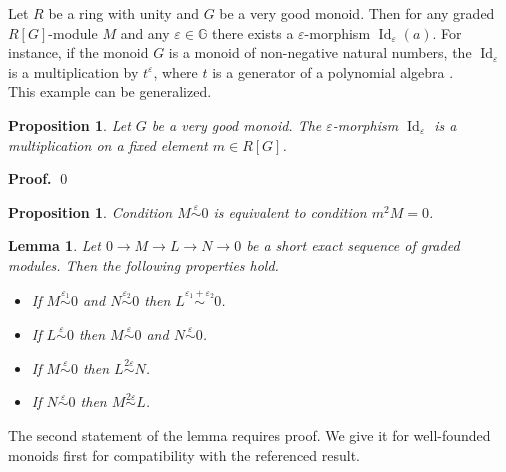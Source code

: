 \documentclass[english,12pt]{article}
\newcounter{stmcounter}[section]
\numberwithin{equation}{section}
\newtheorem{proposition}[stmcounter]{Proposition}
\newtheorem{lemma}[stmcounter]{Lemma}
\theoremstyle{definition}
\theoremstyle{remark}
\newenvironment{pf}{\noindent\textbf{Proof.}}{\qed}
\begin{document}
Let $R$ be a ring with unity and $G$ be a very good monoid. Then for any graded $R[G]$-module $M$ and any $\varepsilon \in \mathbb{G}$ there exists a $\varepsilon$-morphism $\operatorname{Id}_{\varepsilon}(a)$. For instance, if the monoid $G$ is a monoid of non-negative natural numbers, the $\operatorname{Id}_{\varepsilon}$ is a multiplication by $t^{\varepsilon}$, where $t$ is a generator of a polynomial algebra {\cite[Example 2.8]{GS16}}.\\

This example can be generalized.

\begin{proposition}
  \label{mult}
  Let $G$ be a very good monoid. The $\varepsilon$-morphism $\operatorname{Id}_{\varepsilon}$ is a multiplication on a fixed element $m \in R[G]$.
\end{proposition}

\begin{pf}
\end{pf}

\begin{proposition} {\cite[Proposition 2.13]{GS16}}
  \label{epstriv}
  Condition $M \stackrel{\varepsilon}{\sim} 0$ is equivalent to condition $m^2M = 0$.
\end{proposition}

\begin{lemma}
  \label{ops}
  Let $0 \to M \to L \to N \to 0$ be a short exact sequence of graded modules. Then the following properties hold.
  \begin{itemize}
    \item If $M \stackrel{\varepsilon_1}{\sim} 0$ and $N \stackrel{\varepsilon_2}{\sim} 0$ then $L \stackrel{\varepsilon_1 + \varepsilon_2}{\sim} 0$. {\cite[Proposition 4.6]{GS16}}
    \item If $L \stackrel{\varepsilon}{\sim} 0$ then $M \stackrel{\varepsilon}{\sim} 0$ and $N \stackrel{\varepsilon}{\sim} 0$.
    \item If $M \stackrel{\varepsilon}{\sim} 0$ then $L \stackrel{2\varepsilon}{\sim} N$. {\cite[Proposition 4.1]{GS16}}
    \item If $N \stackrel{\varepsilon}{\sim} 0$ then $M \stackrel{2\varepsilon}{\sim} L$. {\cite[Proposition 4.1]{GS16}}
  \end{itemize}
\end{lemma}

The second statement of the lemma requires proof. We give it for well-founded monoids first for compatibility with the referenced result. 
\end{document}
